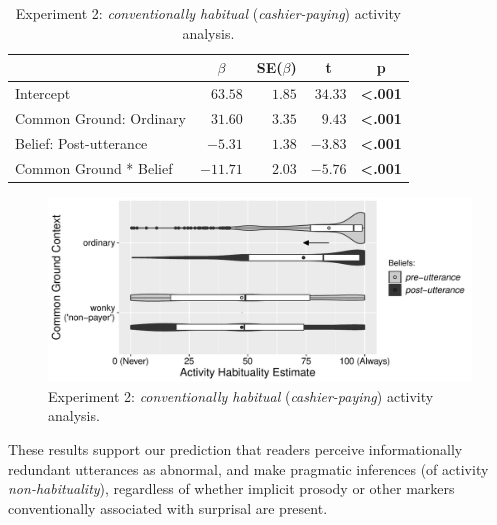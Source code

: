 \documentclass{sp}\usepackage[]{graphicx}\usepackage[]{color}
\makeatletter
\def\maxwidth{ %
  \ifdim\Gin@nat@width>\linewidth
    \linewidth
  \else
    \Gin@nat@width
  \fi
}
\newenvironment{knitrout}{}{} %
\makeatother
\begin{document}
\begin{table}[ht]
\caption{Experiment 2: \textit{conventionally habitual} (\textit{cashier-paying}) activity analysis.\label{tab:exp2habitual}} 
\begin{center}
\begin{tabular}{lrrrl}
\toprule
\multicolumn{1}{l}{}&\multicolumn{1}{c}{$\beta$}&\multicolumn{1}{c}{SE($\beta$)}&\multicolumn{1}{c}{\textbf{t}}&\multicolumn{1}{c}{\textbf{p}}\tabularnewline
\midrule
Intercept&$ 63.58$&$1.85$&$34.33$&\textbf{\textless .001}\tabularnewline
Common Ground: Ordinary&$ 31.60$&$3.35$&$ 9.43$&\textbf{\textless .001}\tabularnewline
Belief: Post-utterance&$ -5.31$&$1.38$&$-3.83$&\textbf{\textless .001}\tabularnewline
Common Ground * Belief&$-11.71$&$2.03$&$-5.76$&\textbf{\textless .001}\tabularnewline
\bottomrule
\end{tabular}\end{center}
\end{table}


\begin{knitrout}
\color{fgcolor}\begin{figure}
\includegraphics[width=\maxwidth]{figure/unnamed-chunk-34-1} \caption{\label{fig:exp2habitual}Experiment 2: \textit{conventionally habitual} (\textit{cashier-paying}) activity analysis.}\label{fig:unnamed-chunk-34}
\end{figure}


\end{knitrout}

These results support our prediction that readers perceive informationally redundant utterances as abnormal, and make pragmatic inferences (of activity \textit{non-habituality}), regardless of whether implicit prosody or other markers conventionally associated with surprisal are present.
\end{document}
